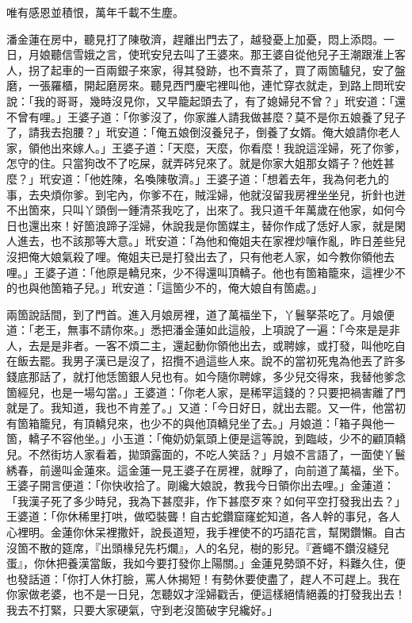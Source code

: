 \begin{myquote}
唯有感恩並積恨，萬年千載不生塵。
\end{myquote}

潘金蓮在房中，聽見打了陳敬濟，趕離出門去了，越發憂上加憂，悶上添悶。一日，月娘聽信雪娥之言，使玳安兒去叫了王婆來。那王婆自從他兒子王潮跟淮上客人，拐了起車的一百兩銀子來家，得其發跡，也不賣茶了，買了兩箇驢兒，安了盤磨，一張羅櫃，開起磨房來。聽見西門慶宅裡叫他，連忙穿衣就走，到路上問玳安說：「我的哥哥，幾時沒見你，又早籠起頭去了，有了媳婦兒不曾？」玳安道：「還不曾有哩。」王婆子道：「你爹沒了，你家誰人請我做甚麼？莫不是你五娘養了兒子了，請我去抱腰？」玳安道：「俺五娘倒沒養兒子，倒養了女婿。{}俺大娘請你老人家，領他出來嫁人。」王婆子道：「天麼，天麼，你看麼！我說這淫婦，死了你爹，怎守的住。只當狗改不了吃屎，{}就弄硶兒來了。就是你家大姐那女婿子？他姓甚麼？」{}玳安道：「他姓陳，名喚陳敬濟。」王婆子道：「想着去年，我為何老九的事，去央煩你爹。到宅內，你爹不在，賊淫婦，他就沒留我房裡坐坐兒，折針也迸不出箇來，{}只叫丫頭倒一鍾清茶我吃了，出來了。我只道千年萬歲在他家，如何今日也還出來！好箇浪蹄子淫婦，休說我是你箇媒主，替你作成了恁好人家，就是閑人進去，也不該那等大意。」玳安道：「為他和俺姐夫在家裡炒嚷作亂，昨日差些兒沒把俺大娘氣殺了哩。俺姐夫已是打發出去了，只有他老人家，如今教你領他去哩。」王婆子道：「他原是轎兒來，少不得還叫頂轎子。他也有箇箱籠來，這裡少不的也與他箇箱子兒。」玳安道：「這箇少不的，俺大娘自有箇處。」

兩箇說話間，到了門首。進入月娘房裡，道了萬福坐下，丫鬟拏茶吃了。月娘便道：「老王，無事不請你來。」悉把潘金蓮如此這般，上項說了一遍：「今來是是非人，去是是非者。一客不煩二主，還起動你領他出去，或聘嫁，或打發，叫他吃自在飯去罷。我男子漢已是沒了，招攬不過這些人來。說不的當初死鬼為他丟了許多錢底那話了，就打他恁箇銀人兒也有。{}如今隨你聘嫁，多少兒交得來，我替他爹念箇經兒，也是一場勾當。」王婆道：「你老人家，是稀罕這錢的？只要把禍害離了門就是了。{}我知道，我也不肯差了。」又道：「今日好日，就出去罷。又一件，他當初有箇箱籠兒，有頂轎兒來，也少不的與他頂轎兒坐了去。」月娘道：「箱子與他一箇，轎子不容他坐。」小玉道：「俺奶奶氣頭上便是這等說，到臨岐，少不的顧頂轎兒。不然街坊人家看着，拋頭露面的，不吃人笑話？」月娘不言語了，一面使丫鬟綉春，前邊叫金蓮來。{}這金蓮一見王婆子在房裡，就睜了，向前道了萬福，坐下。王婆子開言便道：「你快收拾了。剛纔大娘說，教我今日領你出去哩。」金蓮道：「我漢子死了多少時兒，我為下甚麼非，作下甚麼歹來？如何平空打發我出去？」王婆道：「你休稀里打哄，做啞裝聾！自古蛇鑽窟窿蛇知道，各人幹的事兒，各人心裡明。金蓮你休呆裡撒奸，說長道短，我手裡使不的巧語花言，幫閑鑽懶。自古沒箇不散的筵席，『出頭椽兒先朽爛』，人的名兒，樹的影兒。『蒼蠅不鑽沒縫兒蛋』，你休把養漢當飯，我如今要打發你上陽關。」{}金蓮見勢頭不好，料難久住，便也發話道：「你打人休打臉，罵人休揭短！有勢休要使盡了，趕人不可趕上。我在你家做老婆，也不是一日兒，怎聽奴才淫婦戳舌，便這樣絕情絕義的打發我出去！我去不打緊，只要大家硬氣，守到老沒箇破字兒纔好。」{}

